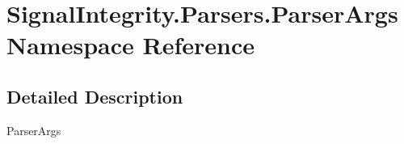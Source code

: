 \hypertarget{namespaceSignalIntegrity_1_1Parsers_1_1ParserArgs}{}\section{Signal\+Integrity.\+Parsers.\+Parser\+Args Namespace Reference}
\label{namespaceSignalIntegrity_1_1Parsers_1_1ParserArgs}


\subsection{Detailed Description}
\begin{DoxyVerb}ParserArgs\end{DoxyVerb}
 